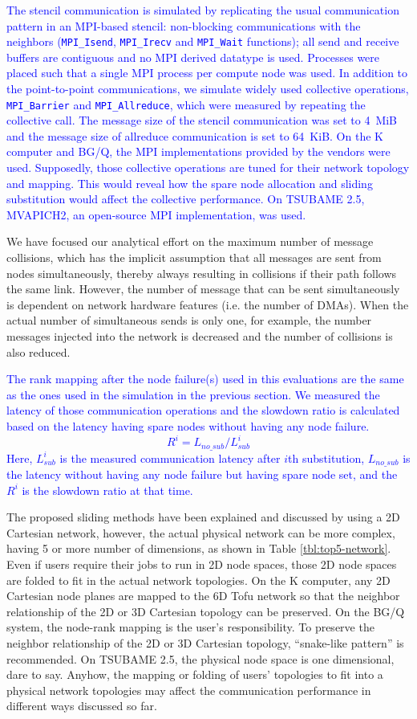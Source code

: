 \documentclass[Afour,times,sagev]{sagej}
\newcommand{\AH}[1]{%
  \textcolor{blue}{#1}}%
\begin{document}
\AH{The stencil communication is simulated by replicating the usual
communication pattern in an MPI-based stencil: non-blocking communications with
the neighbors ({\tt MPI\_Isend}, {\tt MPI\_Irecv} and {\tt MPI\_Wait}
functions); all send and receive buffers are contiguous and no MPI derived
datatype is used.
%
Processes were placed such that a single MPI process per compute node was used.
In addition to the point-to-point communications, we simulate widely used
collective operations, {\tt MPI\_Barrier} and {\tt MPI\_Allreduce}, which were
measured by repeating the collective call. The message size of the stencil
communication was set to 4~MiB and the message size of allreduce communication
is set to 64~KiB.
%
On the K computer and BG/Q, the MPI implementations provided by the vendors were
used. Supposedly, those collective operations are tuned for their network
topology and mapping.  This would reveal how the spare node allocation and
sliding substitution would affect the collective performance. On TSUBAME 2.5,
MVAPICH2, an open-source MPI implementation, was used.}

We have focused our analytical effort on the
maximum number of message collisions, which has the implicit
assumption that all messages are sent from nodes simultaneously,
thereby always resulting in collisions if their path follows the same
link. However, the number of message that can be sent simultaneously
is dependent on network hardware features (i.e. the number of
DMAs). When the actual number of simultaneous sends is only one, for
example, the number messages injected into the network is decreased
and the number of collisions is also reduced.

\AH{The rank mapping after the node
failure(s) used in this evaluations are the same as the ones used in
the simulation in the previous section.
We measured the latency of those communication operations and the
slowdown ratio is calculated based on the latency having spare
nodes without having any node failure.
}
\AH{
\[
R^i = L_{no\_sub} / L_{sub}^i
\]
}
\AH{
Here, $L_{sub}^i$ is the measured communication latency after
$i$th substitution, $L_{no\_sub}$ is the latency without having any
node failure but having spare node set, and the $R^i$ is the
slowdown ratio at that time.
}

The proposed sliding methods have been explained and discussed by
using a 2D Cartesian network, however, the actual physical network can
be more complex, having 5 or more number of dimensions, as shown in
Table \ref{tbl:top5-network}. Even if users
require their jobs to run in 2D node spaces, those 2D node spaces
are folded to fit in the actual network topologies. On the K computer,
any 2D Cartesian node planes are mapped to the 6D Tofu network so that
the neighbor relationship of the 2D or 3D Cartesian topology can be
preserved. On the BG/Q system, the node-rank mapping is the user's
responsibility. To preserve the neighbor relationship of the 2D or 3D
Cartesian topology, ``snake-like pattern'' is
recommended\citep{BGQ-softdev}. On TSUBAME 2.5, the physical node
space is one dimensional, dare to say. Anyhow, the
mapping or folding of users' topologies to fit into a physical network
topologies may affect the communication performance in different ways
discussed so far.
\end{document}
